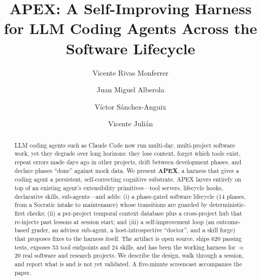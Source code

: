 \documentclass[sigconf,review,anonymous=false]{acmart}
\begin{document}
\title{APEX: A Self-Improving Harness for LLM Coding Agents Across the Software Lifecycle}

\author{Vicente Rivas Monferrer}

\author{Juan Miguel Alberola}

\author{V\'ictor S\'anchez-Anguix}

\author{Vicente Juli\'an}

\renewcommand{\shortauthors}{Rivas Monferrer et al.}

\begin{abstract}
LLM coding agents such as Claude Code now run multi-day, multi-project software
work, yet they degrade over long horizons: they lose context, forget which tools
exist, repeat errors made days ago in other projects, drift between development
phases, and declare phases ``done'' against mock data. We present \textbf{APEX}, a
harness that gives a coding agent a persistent, self-correcting cognitive
substrate. APEX layers entirely on top of an existing agent's extensibility
primitives---tool servers, lifecycle hooks, declarative skills, sub-agents---and
adds: (i) a phase-gated software lifecycle (14 phases, from a Socratic intake to
maintenance) whose transitions are guarded by deterministic-first checks; (ii) a
per-project temporal context database plus a cross-project hub that re-injects past
lessons at session start; and (iii) a self-improvement loop (an outcome-based
grader, an advisor sub-agent, a host-introspective ``doctor'', and a skill forge)
that proposes fixes to the harness itself. The artifact is open source, ships 620
passing tests, exposes 53 tool endpoints and 24 skills, and has been the working
harness for \(\approx\)20 real software and research projects. We describe the
design, walk through a session, and report what is and is not yet validated. A
five-minute screencast accompanies the paper.
\end{abstract}
\end{document}
